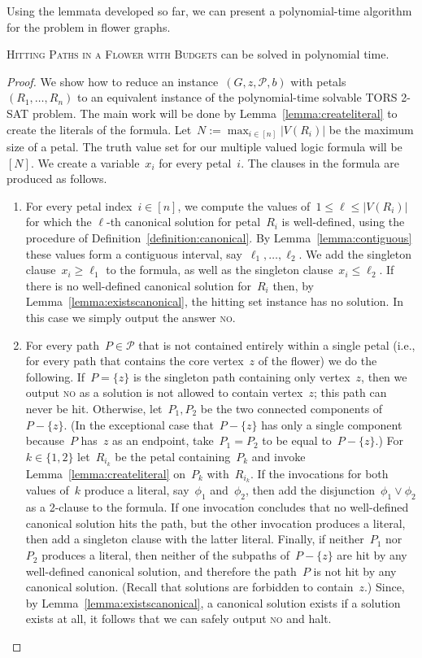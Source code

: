 \let\accentvec\vec  \documentclass{llncs}
\newcommand{\no}{\textsc{no}\xspace}
\renewcommand{\P}{\ensuremath{\mathcal{P}}\xspace}
\newcommand{\HitPathsInFlower}{\textsc{Hitting Paths in a Flower with Budgets}\xspace}
\newcommand{\TORSTwoSat}{\textsc{TORS 2-SAT}\xspace}
\begin{document}
Using the lemmata developed so far, we can present a polynomial-time algorithm for the problem in flower graphs.

\begin{theorem} \label{theorem:pathsinflower:poly}
\HitPathsInFlower can be solved in polynomial time.
\end{theorem}
\begin{proof}
We show how to reduce an instance~$(G,z,\P,b)$ with petals~$(R_1, \ldots, R_n)$ to an equivalent instance of the polynomial-time solvable \TORSTwoSat problem. The main work will be done by Lemma~\ref{lemma:createliteral} to create the literals of the formula. Let~$N := \max _{i \in [n]} |V(R_i)|$ be the maximum size of a petal. The truth value set for our multiple valued logic formula will be~$[N]$. We create a variable~$x_i$ for every petal~$i$. The clauses in the formula are produced as follows.

\begin{enumerate}
	\item For every petal index~$i \in [n]$, we compute the values of~$1 \leq \ell \leq |V(R_i)|$ for which the $\ell$-th canonical solution for petal~$R_i$ is well-defined, using the procedure of Definition~\ref{definition:canonical}. By Lemma~\ref{lemma:contiguous} these values form a contiguous interval, say~$\ell_1, \ldots, \ell_2$. We add the singleton clause~$x_i \geq \ell_1$ to the formula, as well as the singleton clause~$x_i \leq \ell_2$. If there is no well-defined canonical solution for~$R_i$ then, by Lemma~\ref{lemma:existscanonical}, the hitting set instance has no solution. In this case we simply output the answer \no.
	\item For every path~$P \in \P$ that is not contained entirely within a single petal (i.e., for every path that contains the core vertex~$z$ of the flower) we do the following. If~$P = \{z\}$ is the singleton path containing only vertex~$z$, then we output \no as a solution is not allowed to contain vertex~$z$; this path can never be hit. Otherwise, let~$P_1, P_2$ be the two connected components of~$P - \{z\}$. (In the exceptional case that~$P - \{z\}$ has only a single component because~$P$ has~$z$ as an endpoint, take~$P_1 = P_2$ to be equal to~$P - \{z\}$.) For~$k \in \{1,2\}$ let~$R_{i_k}$ be the petal containing~$P_k$ and invoke Lemma~\ref{lemma:createliteral} on~$P_k$ with~$R_{i_k}$. If the invocations for both values of~$k$ produce a literal, say~$\phi_1$ and~$\phi_2$, then add the disjunction~$\phi_1 \vee \phi_2$ as a 2-clause to the formula. If one invocation concludes that no well-defined canonical solution hits the path, but the other invocation produces a literal, then add a singleton clause with the latter literal. Finally, if neither~$P_1$ nor~$P_2$ produces a literal, then neither of the subpaths of~$P - \{z\}$ are hit by any well-defined canonical solution, and therefore the path~$P$ is not hit by any canonical solution. (Recall that solutions are forbidden to contain~$z$.)  Since, by Lemma~\ref{lemma:existscanonical}, a canonical solution exists if a solution exists at all, it follows that we can safely output \no and halt.
\end{enumerate}


\end{proof}
\end{document}

